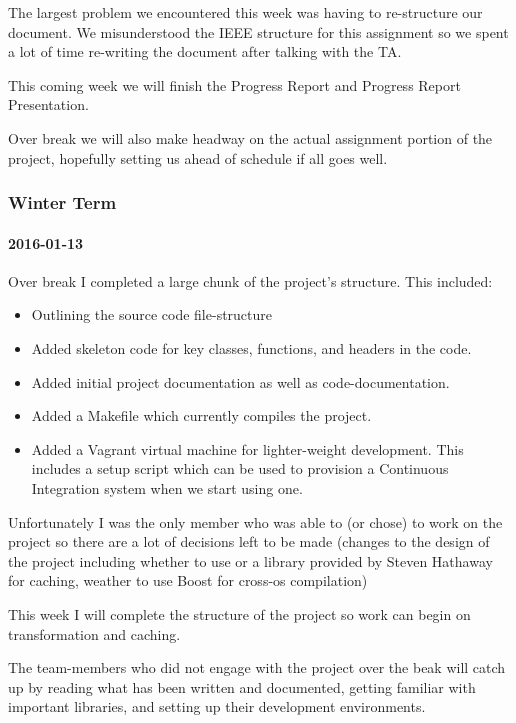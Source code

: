 The largest problem we encountered this week was having to re-structure our document.
We misunderstood the IEEE structure for this assignment so we spent a lot of time re-writing the document after talking with the TA.

This coming week we will finish the Progress Report and Progress Report Presentation.

Over break we will also make headway on the actual assignment portion of the project, hopefully setting us ahead of schedule if all goes well.

\subsubsection{Winter Term}

\paragraph{2016-01-13}

Over break I completed a large chunk of the project's structure.
This included:

\begin{itemize}
  \item Outlining the source code file-structure
  \item Added skeleton code for key classes, functions, and headers in the code.
  \item Added initial project documentation as well as code-documentation.
  \item Added a Makefile which currently compiles the project.
  \item Added a Vagrant virtual machine for lighter-weight development.
This includes a setup script which can be used to provision a Continuous Integration system when we start using one.
\end{itemize}

Unfortunately I was the only member who was able to (or chose) to work on the project so there are a lot of decisions left to be made (changes to the design of the project including whether to use   or a library provided by Steven Hathaway for caching, weather to use Boost for cross-os compilation)

This week I will complete the structure of the project so work can begin on transformation and caching.

The team-members who did not engage with the project over the beak will catch up by reading what has been written and documented, getting familiar with important libraries, and setting up their development environments.

